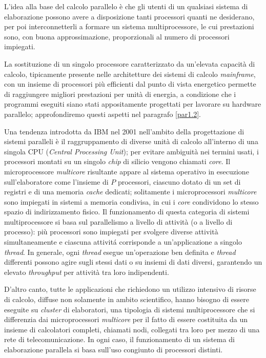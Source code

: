 \nocite{Patterson2022}
\nocite{Silberschatz2014}
L'idea alla base del calcolo parallelo \`e che gli utenti di un qualsiasi sistema di elaborazione possono avere a disposizione tanti processori
quanti ne desiderano, per poi interconnetterli a formare un sistema
multiprocessore, le cui prestazioni sono, con buona approssimazione,
proporzionali al numero di processori impiegati.

La sostituzione di un singolo processore caratterizzato da un'elevata
capacit\`a di calcolo, tipicamente presente nelle architetture dei sistemi di calcolo
\textit{mainframe}, con un insieme di processori pi\`u efficienti
dal punto di vista energetico permette di raggiungere migliori prestazioni
per unit\`a di energia, a condizione che i programmi eseguiti siano stati
appositamente progettati per lavorare su hardware parallelo; approfondiremo questi aspetti nel paragrafo \ref{par1.2}.

Una tendenza introdotta da IBM nel 2001 nell'ambito della progettazione di sistemi paralleli \`e il raggruppamento
di diverse unit\`a di calcolo all'interno di una singola CPU (\textit{Central Processing Unit}); per evitare ambiguit\`a nei termini usati, i processori montati su un singolo \textit{chip} di silicio vengono chiamati \textit{core}.\newline
Il microprocessore \textit{multicore} risultante appare al sistema operativo in esecuzione sull'elaboratore come l'insieme di $P$ processori, ciascuno dotato di un set di registri e di una memoria \textit{cache} dedicati; solitamente i microprocessori \textit{multicore} sono impiegati in sistemi a memoria condivisa, in cui i \textit{core} condividono lo stesso spazio di indirizzamento fisico.\newline
Il funzionamento di questa categoria di sistemi multiprocessore si basa sul parallelismo a livello di attivit\`a (o a livello di processo): pi\`u
processori sono impiegati per svolgere diverse attivit\`a simultaneamente e ciascuna attivit\'a corrisponde a un'applicazione a singolo
\textit{thread}.\newline
In generale, ogni \textit{thread} esegue un'operazione ben definita e \textit{thread} differenti possono agire sugli stessi
dati o su insiemi di dati diversi, garantendo un elevato \textit{throughput} per attivit\`a tra loro indipendenti.

D'altro canto, tutte le applicazioni che richiedono un utilizzo intensivo di risorse di calcolo, diffuse non solamente in ambito
scientifico, hanno bisogno di essere eseguite su \textit{cluster} di elaboratori, una tipologia di sistemi multiprocessore che si differenzia dai microprocessori \textit{multicore} per il fatto di essere costituita da un insieme di calcolatori completi, chiamati nodi, collegati tra loro per mezzo di una rete di telecomunicazione.\newline
In ogni caso, il funzionamento di un sistema di elaborazione parallela si basa sull'uso congiunto di processori distinti.

